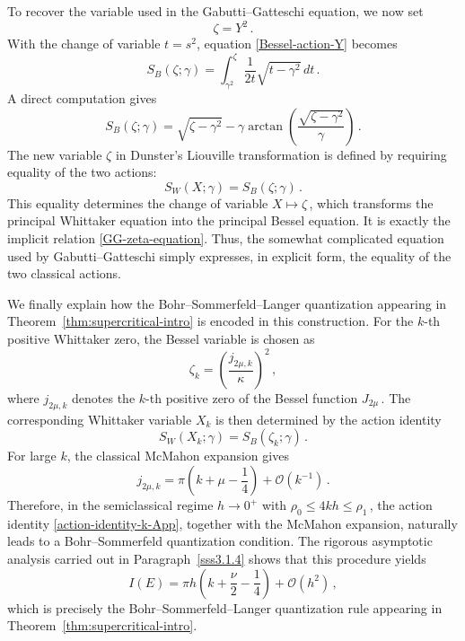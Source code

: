 \documentclass[11pt]{amsart}
\numberwithin{equation}{section}
\theoremstyle{remark}
\newcommand{\mn}{\medskip\noindent}
\begin{document}
\mn
To recover the variable used in the Gabutti--Gatteschi equation, we
now set
\begin{equation}\label{Bessel-zeta-variable}
\zeta=Y^2\,.
\end{equation}
With the change of variable $t=s^2$, equation
\eqref{Bessel-action-Y} becomes
\begin{equation}\label{Bessel-action-def}
S_B(\zeta;\gamma)
=
\int_{\gamma^2}^{\zeta}
\frac{1}{2t}\sqrt{t-\gamma^2}\,dt\,.
\end{equation}
A direct computation gives
\begin{equation}\label{Bessel-action-explicit}
S_B(\zeta;\gamma)
=
\sqrt{\zeta-\gamma^2}
-
\gamma
\arctan\left(
\frac{\sqrt{\zeta-\gamma^2}}{\gamma}
\right)\,.
\end{equation}
%
\mn
The new variable $\zeta$ in Dunster's Liouville transformation is
defined by requiring equality of the two actions:
\begin{equation}\label{Liouville-action-identity}
	S_W(X;\gamma)=S_B(\zeta;\gamma)\,.
\end{equation}
This equality determines the change of variable $X\mapsto\zeta\,$, 
which transforms the principal Whittaker equation into the principal
Bessel equation. It is exactly the implicit relation
\eqref{GG-zeta-equation}. Thus, the somewhat complicated equation
used by Gabutti--Gatteschi simply expresses, in explicit form, the
equality of the two classical actions.

\mn
\mn
We finally explain how the Bohr--Sommerfeld--Langer quantization
appearing in Theorem~\ref{thm:supercritical-intro} is encoded in this
construction. For the $k$-th positive Whittaker zero, the Bessel
variable is chosen as
\begin{equation}\label{Bessel-zero-zeta-App}
	\zeta_k
	=
	\left(
	\frac{j_{2\mu,k}}{\kappa}
	\right)^2\,,
\end{equation}
where $j_{2\mu,k}$ denotes the $k$-th positive zero of the Bessel
function $J_{2\mu}$\,. The corresponding Whittaker variable $X_k$ is then determined by the
action identity
\begin{equation}\label{action-identity-k-App}
	S_W(X_k;\gamma)
	=
	S_B(\zeta_k;\gamma)\,.
\end{equation}
For large $k$, the classical McMahon expansion gives
\begin{equation}\label{McMahon-Langer-App}
	j_{2\mu,k}
	=
	\pi\left(k+\mu-\frac14\right)
	+
	\mathcal O(k^{-1})\,.
\end{equation}
Therefore, in the semiclassical regime $h\to0^+$ with
$\rho_0\leq 4kh\leq\rho_1\,$, the action identity
\eqref{action-identity-k-App}, together with the McMahon expansion,
naturally leads to a Bohr--Sommerfeld quantization condition. The rigorous asymptotic analysis carried out in
Paragraph~\ref{sss3.1.4}  shows that this procedure yields
\begin{equation}\label{BS-Langer-final-App}
	I(E)
	=
	\pi h
	\left(
	k+\frac{\nu}{2}-\frac14
	\right)
	+
	\mathcal O(h^2)\,,
\end{equation}
which is precisely the Bohr--Sommerfeld--Langer quantization rule
appearing in Theorem~\ref{thm:supercritical-intro}.
\end{document}
